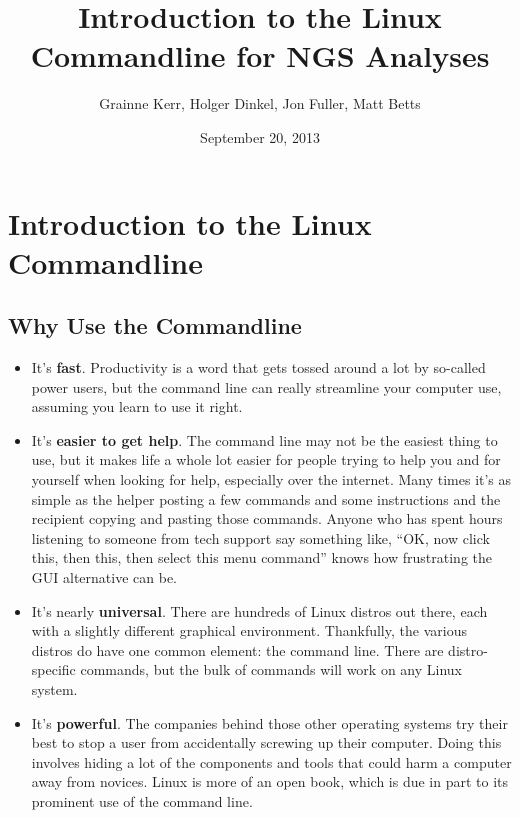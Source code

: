 \documentclass[a4paper,11pt,english]{sphinxmanual}
\title{Introduction to the Linux Commandline for NGS Analyses}
\date{September 20, 2013}
\author{Grainne Kerr, Holger Dinkel, Jon Fuller, Matt Betts}
\begin{document}
\maketitle
\tableofcontents
{}\label{index::doc}



\chapter{Introduction to the Linux Commandline}
\label{introduction:introduction-to-the-linux-commandline}\label{introduction:introduction-to-the-linux-commandline-for-ngs-analyses}\label{introduction::doc}

\section{Why Use the Commandline}
\label{introduction:why-use-the-commandline}\begin{itemize}
\item {} 
It's \textbf{fast}. Productivity is a word that gets tossed around a lot by so-called power users, but the command line can really streamline your computer use, assuming you learn to use it right.

\item {} 
It's \textbf{easier to get help}. The command line may not be the easiest thing to use, but it makes life a whole lot easier for people trying to help you and for yourself when looking for help, especially over the internet. Many times it's as simple as the helper posting a few commands and some instructions and the recipient copying and pasting those commands. Anyone who has spent hours listening to someone from tech support say something like, “OK, now click this, then this, then select this menu command” knows how frustrating the GUI alternative can be.

\item {} 
It's nearly \textbf{universal}. There are hundreds of Linux distros out there, each with a slightly different graphical environment. Thankfully, the various distros do have one common element: the command line. There are distro-specific commands, but the bulk of commands will work on any Linux system.

\item {} 
It's \textbf{powerful}. The companies behind those other operating systems try their best to stop a user from accidentally screwing up their computer. Doing this involves hiding a lot of the components and tools that could harm a computer away from novices. Linux is more of an open book, which is due in part to its prominent use of the command line.

\end{itemize}
\end{document}
